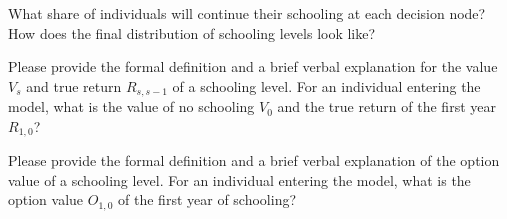 \begin{boenumerate}\setcounter{enumi}{3}

\item What share of individuals will continue their schooling at each decision node? How does the final distribution of schooling levels look like?

\item Please provide the formal definition and a brief verbal explanation for the value  $V_s$ and true return $R_{s, s-1}$ of a schooling level. For an individual entering the model, what is the value of no schooling $V_0$ and the true return of the first year $R_{1, 0}$?

\item Please provide the formal definition and a brief verbal explanation of the option value of a schooling level. For an individual entering the model, what is the option value $O_{1, 0}$ of the first year of schooling?

\end{boenumerate}
